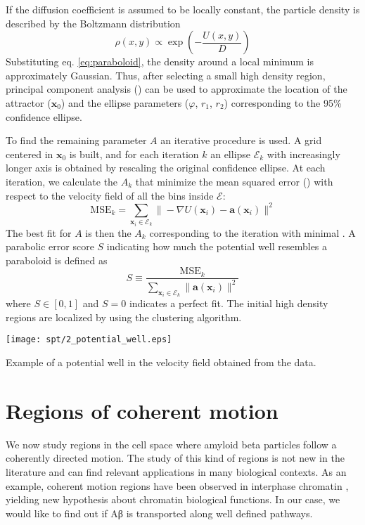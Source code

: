 If the diffusion coefficient is assumed to be locally constant, the particle density is described by the Boltzmann distribution
\begin{equation}
 \rho(x, y) \propto \exp\left(-\frac{U(x, y)}{D}\right)
\end{equation}
Substituting eq. \ref{eq:paraboloid}, the density around a local minimum is approximately Gaussian. Thus, after selecting a small high density region, principal component analysis () can be used to approximate the location of the attractor ($\bm{x}_0$) and the ellipse parameters ($\varphi$, $r_1$, $r_2$) corresponding to the 95\% confidence ellipse.

To find the remaining parameter $A$ an iterative procedure is used. A grid centered in $\bm{x}_0$ is built, and for each iteration $k$ an ellipse $\mathcal{E}_k$ with increasingly longer axis is obtained by rescaling the original confidence ellipse. At each iteration, we calculate the $A_k$ that minimize the mean squared error () with respect to the velocity field of all the bins inside $\mathcal{E}$:
\begin{equation}
 \mathrm{MSE}_k = \sum_{\bm{x}_i \in \mathcal{E}_k} \| -\nabla U(\bm{x}_i) - \bm{a}(\bm{x}_i) \|^2
\end{equation}
The best fit for $A$ is then the $A_k$ corresponding to the iteration with minimal .
A parabolic error score $S$ indicating how much the potential well resembles a paraboloid is defined as
\begin{equation}
 S \equiv \frac{\mathrm{MSE}_k}{\sum_{\bm{x}_i \in \mathcal{E}_k} \|\bm{a}(\bm{x}_i)\|^2}
\end{equation}
where $S \in [0, 1]$ and $S = 0$ indicates a perfect fit.
The initial high density regions are localized by using the  clustering algorithm.

\begin{marginfigure}
  \texttt{[image: spt/2\_potential\_well.eps]}
  \caption{Example of a potential well in the velocity field obtained from the  data.}\label{fig:well}
\end{marginfigure}


\section{Regions of coherent motion}\label{sec:pathways}

We now study regions in the cell space where amyloid beta particles follow a coherently directed motion. The study of this kind of regions is not new in the literature and can find relevant applications in many biological contexts. As an example, coherent motion regions have been observed in interphase chromatin , yielding new hypothesis about chromatin biological functions. In our case, we would like to find out if Aβ is transported along well defined pathways.

